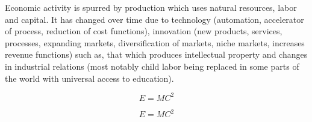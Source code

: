 \documentclass[12pt]{article}
\begin{document}
 Economic activity is spurred by production which uses natural resources, labor and capital. It has changed over time due to technology (automation, accelerator of process, reduction of cost functions), innovation (new products, services, processes, expanding markets, diversification of markets, niche markets, increases revenue functions) such as, that which produces intellectual property and changes in industrial relations (most notably child labor being replaced in some parts of the world with universal access to education).

\begin{equation}
E = MC^{2}
\end{equation}

\begin{equation*}
E = MC^{2}
\end{equation*}
\end{document}
